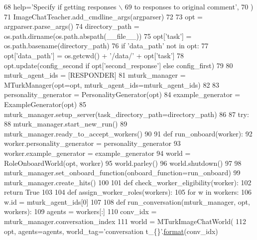 \begin{DoxyCode}
68         help=\textcolor{stringliteral}{'Specify if getting responses \(\backslash\)}
69 \textcolor{stringliteral}{                           to responses to original comment'},
70     )
71     ImageChatTeacher.add\_cmdline\_args(argparser)
72 
73     opt = argparser.parse\_args()
74     directory\_path = os.path.dirname(os.path.abspath(\_\_file\_\_))
75     opt[\textcolor{stringliteral}{'task'}] = os.path.basename(directory\_path)
76     \textcolor{keywordflow}{if} \textcolor{stringliteral}{'data\_path'} \textcolor{keywordflow}{not} \textcolor{keywordflow}{in} opt:
77         opt[\textcolor{stringliteral}{'data\_path'}] = os.getcwd() + \textcolor{stringliteral}{'/data/'} + opt[\textcolor{stringliteral}{'task'}]
78     opt.update(config\_second \textcolor{keywordflow}{if} opt[\textcolor{stringliteral}{'second\_response'}] \textcolor{keywordflow}{else} config\_first)
79 
80     mturk\_agent\_ids = [RESPONDER]
81     mturk\_manager = MTurkManager(opt=opt, mturk\_agent\_ids=mturk\_agent\_ids)
82 
83     personality\_generator = PersonalityGenerator(opt)
84     example\_generator = ExampleGenerator(opt)
85     mturk\_manager.setup\_server(task\_directory\_path=directory\_path)
86 
87     \textcolor{keywordflow}{try}:
88         mturk\_manager.start\_new\_run()
89         mturk\_manager.ready\_to\_accept\_workers()
90 
91         \textcolor{keyword}{def }run\_onboard(worker):
92             worker.personality\_generator = personality\_generator
93             worker.example\_generator = example\_generator
94             world = RoleOnboardWorld(opt, worker)
95             world.parley()
96             world.shutdown()
97 
98         mturk\_manager.set\_onboard\_function(onboard\_function=run\_onboard)
99         mturk\_manager.create\_hits()
100 
101         \textcolor{keyword}{def }check\_worker\_eligibility(worker):
102             \textcolor{keywordflow}{return} \textcolor{keyword}{True}
103 
104         \textcolor{keyword}{def }assign\_worker\_roles(workers):
105             \textcolor{keywordflow}{for} w \textcolor{keywordflow}{in} workers:
106                 w.id = mturk\_agent\_ids[0]
107 
108         \textcolor{keyword}{def }run\_conversation(mturk\_manager, opt, workers):
109             agents = workers[:]
110             conv\_idx = mturk\_manager.conversation\_index
111             world = MTurkImageChatWorld(
112                 opt, agents=agents, world\_tag=\textcolor{stringliteral}{'conversation t\_\{\}'}.\hyperlink{namespaceparlai_1_1chat__service_1_1services_1_1messenger_1_1shared__utils_a32e2e2022b824fbaf80c747160b52a76}{format}(conv\_idx)

\end{DoxyCode}
